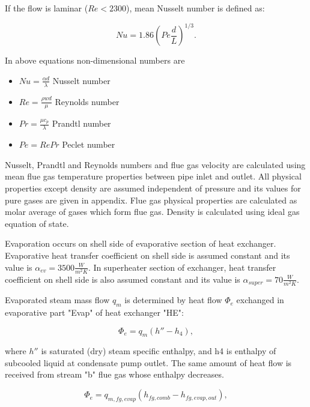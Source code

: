 \documentclass{article}
\begin{document}
	\noindent
	If the flow is laminar ($Re<2300$), mean Nusselt number is defined as:
	
	\begin{equation}\label{eq:nusselt2}
		Nu = 1.86 \left(Pe \frac{d}{L}\right)^{1/3}.
	\end{equation}
	
	\noindent
	In above equations non-dimensional numbers are
	
	\begin{itemize}
		\item $Nu = \frac{\alpha d}{\lambda}$ Nusselt number
		\item $Re = \frac{\rho w d}{\mu}$ Reynolds number
		\item $Pr = \frac{\mu c_p}{\lambda}$ Prandtl number
		\item $Pe = Re Pr$ Peclet number
	\end{itemize}

	\noindent
	Nusselt, Prandtl and Reynolds numbers and flue gas velocity are calculated using mean flue gas temperature properties between pipe inlet and outlet. All physical properties except density are assumed independent of pressure and its values for pure gases are given in appendix. Flue gas physical properties are calculated as molar average of gases which form flue gas. Density is calculated using ideal gas equation of state.
	
	\noindent
	Evaporation occurs on shell side of evaporative section of heat exchanger. Evaporative heat transfer coefficient on shell side is assumed constant and its value is $\alpha_{ev}=3500 \frac{W}{m^2 K}$. In superheater section of exchanger, heat transfer coefficient on shell side is also assumed constant and its value is $\alpha_{super}=70 \frac{W}{m^2 K}$.
	
	Evaporated steam mass flow $q_m$ is determined by heat flow $\Phi_e$ exchanged in evaporative part "Evap" of heat exchanger "HE":
	
	\begin{equation}\label{eq:evap_steam_mass}
		\Phi_e = q_m(h'' -h_4),
	\end{equation}
	
	where $h''$ is saturated (dry) steam specific enthalpy, and h4 is enthalpy of subcooled liquid at condensate pump outlet. 
	The same amount of heat flow is received from stream "b" flue gas whose enthalpy decreases.
	
	\begin{equation}\label{eq:evap_steam_mass2}
		\Phi_e = q_{m,fg,evap} (h_{fg,comb} - h_{fg,evap,out}),
	\end{equation}
	
\end{document}
